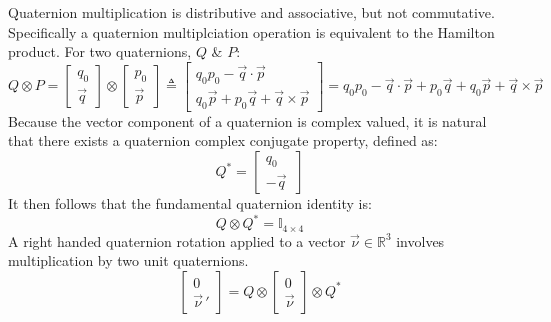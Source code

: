 Quaternion multiplication is distributive and associative, but not commutative. Specifically a quaternion multiplciation operation is equivalent to the Hamilton product. For two quaternions, $Q$ \& $P$:
\begin{subequations}
\begin{equation}
Q\otimes P = \begin{bmatrix}
q_0 \\
\vec{q}
\end{bmatrix}
\otimes
\begin{bmatrix}
p_0 \\
\vec{p}
\end{bmatrix}
\end{equation}
\begin{equation}
\triangleq\begin{bmatrix}
q_0p_0-\vec{q}\cdot\vec{p}\\
q_0\vec{p}+p_0\vec{q}+\vec{q}\times\vec{p}
\end{bmatrix}
\end{equation}
\begin{equation}\label{eq:quaternion-product}
=q_0 p_0 - \vec{q}\cdot \vec{p}+p_0 \vec{q} + q_0 \vec{p} + \vec{q}\times\vec{p}
\end{equation}
\end{subequations}
Because the vector component of a quaternion is complex valued, it is natural that there exists a quaternion complex conjugate property, defined as:
\begin{equation}
Q^*=\begin{bmatrix}
q_0 \\
-\vec{q}~
\end{bmatrix}
\end{equation}
It then follows that the fundamental quaternion identity is:
\begin{equation}
Q\otimes Q^* = \mathbb{I}_{4\times 4}
\end{equation}
A right handed quaternion rotation applied to a vector $\vec{\nu} \in\mathbb{R}^3$ involves multiplication by two unit quaternions. 
\begin{equation}
\begin{bmatrix}
0 \\
\vec{\nu}\hspace{2pt}'
\end{bmatrix}
=Q\otimes
\begin{bmatrix}
0 \\
\vec{\nu}
\end{bmatrix}
\otimes Q^*
\end{equation}
